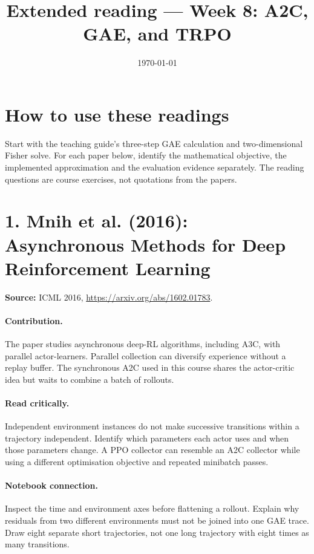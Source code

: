 \documentclass[11pt]{scrartcl}
\title{Extended reading --- Week 8: A2C, GAE, and TRPO}
\date{\today}
\begin{document}
\maketitle

\section*{How to use these readings}
Start with the teaching guide's three-step GAE calculation and two-dimensional
Fisher solve. For each paper below, identify the mathematical objective,
the implemented approximation and the evaluation evidence separately.
The reading questions are course exercises, not quotations from the papers.

\section*{1. Mnih et al. (2016): Asynchronous Methods for Deep Reinforcement Learning}
\textbf{Source:} ICML 2016, \url{https://arxiv.org/abs/1602.01783}.

\paragraph{Contribution.} The paper studies asynchronous deep-RL algorithms,
including A3C, with parallel actor-learners. Parallel collection can diversify
experience without a replay buffer. The synchronous A2C used in this course
shares the actor-critic idea but waits to combine a batch of rollouts.

\paragraph{Read critically.} Independent environment instances do not make
successive transitions within a trajectory independent. Identify which
parameters each actor uses and when those parameters change. A PPO collector
can resemble an A2C collector while using a different optimisation objective
and repeated minibatch passes.

\paragraph{Notebook connection.} Inspect the time and environment axes before
flattening a rollout. Explain why residuals from two different environments
must not be joined into one GAE trace. Draw eight separate short trajectories,
not one long trajectory with eight times as many transitions.
\end{document}
